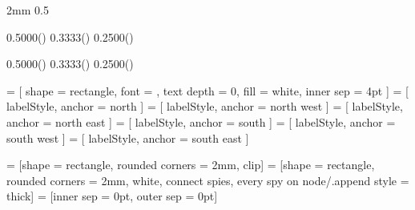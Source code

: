 
\usepackage{calc}
\usepackage{tikz}
\usetikzlibrary{calc,positioning,spy,shapes}



\newlength{\pfull}  \setlength{\pfull}  {2mm}
\newlength{\phalf}  \setlength{\phalf}  {0.5\pfull}

\newlength{\lwffp}   \setlength{\lwffp}   {0.5000\dimexpr(\pfull)}
\newlength{\lwfffp}  \setlength{\lwfffp}  {0.3333\dimexpr(\pfull)}
\newlength{\lwffffp} \setlength{\lwffffp} {0.2500\dimexpr(\pfull)}
\newlength{\lwfffffp}\setlength{\lwfffffp}{0.2000\dimexpr(\linewidth-4.0\pfull)}

\newlength{\twffp}   \setlength{\twffp}   {0.5000\dimexpr(\pfull)}
\newlength{\twfffp}  \setlength{\twfffp}  {0.3333\dimexpr(\pfull)}
\newlength{\twffffp} \setlength{\twffffp} {0.2500\dimexpr(\pfull)}
\newlength{\twfffffp}\setlength{\twfffffp}{0.2000\dimexpr(\textwidth-4.0\pfull)}

 = [ shape = rectangle, font = \scriptsize, text depth = 0, fill = white, inner sep = 4pt ]
  = [ labelStyle, anchor = north ]
 = [ labelStyle, anchor = north west ]
 = [ labelStyle, anchor = north east ]
  = [ labelStyle, anchor = south ]
 = [ labelStyle, anchor = south west ]
 = [ labelStyle, anchor = south east ]

 = [shape = rectangle, rounded corners = 2mm, clip] %
 = [shape = rectangle, rounded corners = 2mm, %
    white, connect spies, every spy on node/.append style = {thick}] %
 = [inner sep = 0pt, outer sep = 0pt] %
